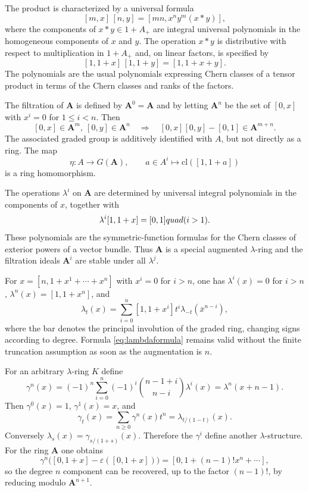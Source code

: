 \documentclass[14pt]{extarticle}
\newcommand{\eps}{\varepsilon}
\begin{document}
The product is characterized by a universal formula
\begin{equation}\label{eq:Aproduct}
   [m,x]\,[n,y]=[mn,x^ny^m(x*y)],
\end{equation}
where the components of $x*y\in1+A_+$ are integral universal polynomials in the homogeneous components of $x$ and $y$. The operation $x*y$ is distributive with respect to multiplication in $1+A_+$ and, on linear factors, is specified by
\begin{equation}\label{eq:lineargraded}
   [1,1+x]\,[1,1+y]=[1,1+x+y].
\end{equation}
The polynomials are the usual polynomials expressing Chern classes of a tensor product in terms of the Chern classes and ranks of the factors.

The filtration of $\mathbf A$ is defined by $\mathbf A^0=\mathbf A$ and by letting $\mathbf A^n$ be the set of $[0,x]$ with $x^i=0$ for $1\leq i<n$. Then
\[
   [0,x]\in\mathbf A^m,
   \ [0,y]\in\mathbf A^n
   \quad\Longrightarrow\quad
   [0,x][0,y]-[0,1]\in\mathbf A^{m+n}.
\]
The associated graded group is additively identified with $A$, but not directly as a ring. The map
\[
   \eta:A\to G(\mathbf A),\qquad
   a\in A^i\longmapsto \mathrm{cl}([1,1+a])
\]
is a ring homomorphism.

The operations $\lambda^i$ on $\mathbf A$ are determined by universal integral polynomials in the components of $x$, together with
\[
   \lambda^i[1,1+x]=[0,1]\\quad(i>1).
\]
These polynomials are the symmetric-function formulas for the Chern classes of exterior powers of a vector bundle. Thus $\mathbf A$ is a special augmented $\lambda$-ring and the filtration ideals $\mathbf A^i$ are stable under all $\lambda^j$.

For $x=[n,1+x^1+\cdots+x^n]$ with $x^i=0$ for $i>n$, one has $\lambda^i(x)=0$ for $i>n$, $\lambda^n(x)=[1,1+x^n]$, and
\begin{equation}\label{eq:lambdaformula}
   \lambda_t(x)=\sum_{i=0}^n[1,1+x^i]t^i\lambda_{-t}(\bar x^{n-i}),
\end{equation}
where the bar denotes the principal involution of the graded ring, changing signs according to degree. Formula \eqref{eq:lambdaformula} remains valid without the finite truncation assumption as soon as the augmentation is $n$.

For an arbitrary $\lambda$-ring $K$ define
\begin{equation}\label{eq:gammaops}
   \gamma^n(x)=(-1)^n\sum_{i=0}^n(-1)^i
   \binom{n-1+i}{n-i}\lambda^i(x)
   =\lambda^n(x+n-1).
\end{equation}
Then $\gamma^0(x)=1$, $\gamma^1(x)=x$, and
\[
   \gamma_t(x)=\sum_{n\geq 0}\gamma^n(x)t^n
             =\lambda_{t/(1-t)}(x).
\]
Conversely $\lambda_s(x)=\gamma_{s/(1+s)}(x)$. Therefore the $\gamma^i$ define another $\lambda$-structure. For the ring $\mathbf A$ one obtains
\begin{equation}\label{eq:gammafiltration}
\gamma^n\bigl([0,1+x]-\eps([0,1+x])\bigr)
   =[0,1+(n-1)!x^n+\cdots],
\end{equation}
so the degree $n$ component can be recovered, up to the factor $(n-1)!$, by reducing modulo $\mathbf A^{n+1}$.
\end{document}
